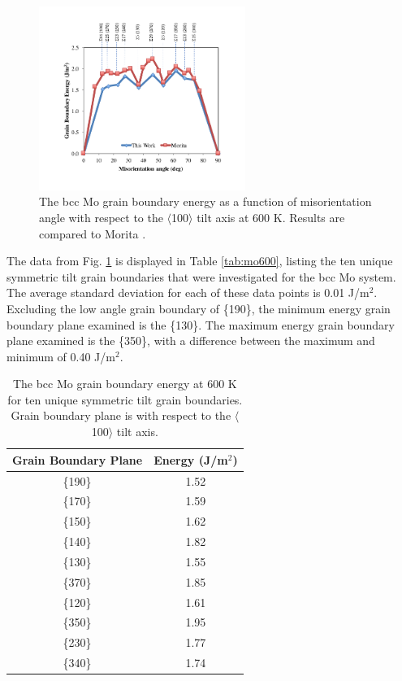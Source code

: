 \documentclass[review]{elsarticle}
\begin{document}
\begin{figure}[h]
 \centering
 \includegraphics[width=0.6\textwidth]{mo600B.png} 
 \caption{The bcc Mo grain boundary energy as a function of misorientation angle with respect to the $\langle$100$\rangle$ tilt axis at 600 K. Results are compared to Morita \cite{morita1997}.}
 \label{fig:mo600}
\end{figure}

\FloatBarrier

The data from Fig. \ref{fig:mo600} is displayed in Table \ref{tab:mo600}, listing the ten unique symmetric tilt grain boundaries that were investigated for the bcc Mo system. The average standard deviation for each of these data points is 0.01 J/m$^{2}$. Excluding the low angle grain boundary of \{190\}, the minimum energy grain boundary plane examined is the \{130\}. The maximum energy grain boundary plane examined is the \{350\}, with a difference between the maximum and minimum of 0.40 J/m$^{2}$.

\begin{table}[h]
\caption{The bcc Mo grain boundary energy at 600 K for ten unique symmetric tilt grain boundaries. Grain boundary plane is with respect to the $\langle$100$\rangle$ tilt axis.} \label{tab:mo600}
\begin{center}
\begin{tabular}{|c|c|}
	\hline
	Grain Boundary Plane & Energy (J/m$^{2}$) \\
	 \hline
	 \{190\} & 1.52 \\
	 \{170\} & 1.59 \\
	 \{150\} & 1.62 \\
	 \{140\} & 1.82 \\
	 \{130\} & 1.55 \\	 
	 \{370\} & 1.85 \\
	 \{120\} & 1.61 \\
	 \{350\} & 1.95 \\
	 \{230\} & 1.77 \\
	 \{340\} & 1.74 \\
	 \hline
\end{tabular}
\end{center}
\label{default}
\end{table}
\end{document}
